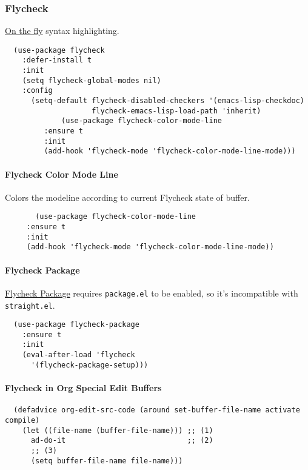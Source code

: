 \documentclass[11pt]{article}
\begin{document}
\subsubsection*{Flycheck}
\label{sec:org509c7c2}

\href{https://github.com/Flycheck/Flycheck}{On the fly} syntax highlighting.

\begin{verbatim}
  (use-package flycheck
    :defer-install t
    :init
    (setq flycheck-global-modes nil)
    :config
      (setq-default flycheck-disabled-checkers '(emacs-lisp-checkdoc)
                    flycheck-emacs-lisp-load-path 'inherit)
             (use-package flycheck-color-mode-line
      	 :ensure t
      	 :init
      	 (add-hook 'flycheck-mode 'flycheck-color-mode-line-mode)))
\end{verbatim}

\paragraph*{Flycheck Color Mode Line}
\label{sec:org7f188cb}

Colors the modeline according to current Flycheck state of buffer.

\begin{verbatim}
       (use-package flycheck-color-mode-line
	 :ensure t
	 :init
	 (add-hook 'flycheck-mode 'flycheck-color-mode-line-mode))
\end{verbatim}

\paragraph*{Flycheck Package}
\label{sec:org570c2ee}

\href{https://github.com/purcell/flycheck-package}{Flycheck Package} requires \texttt{package.el} to be enabled, so it's incompatible with \texttt{straight.el}.

\begin{verbatim}
  (use-package flycheck-package
    :ensure t
    :init
    (eval-after-load 'flycheck
      '(flycheck-package-setup)))
\end{verbatim}

\paragraph*{Flycheck in Org Special Edit Buffers}
\label{sec:org8f1b5fc}

\begin{verbatim}
  (defadvice org-edit-src-code (around set-buffer-file-name activate compile)
    (let ((file-name (buffer-file-name))) ;; (1)
      ad-do-it                            ;; (2)
      ;; (3)
      (setq buffer-file-name file-name)))
\end{verbatim}
\end{document}
